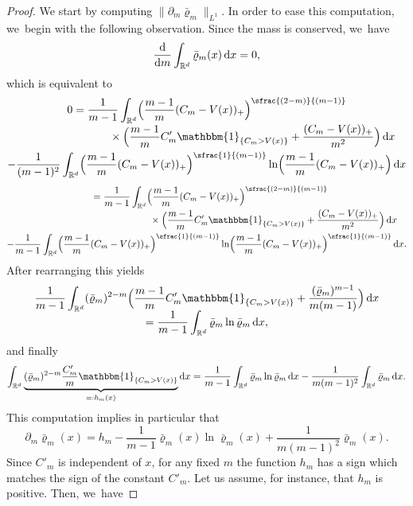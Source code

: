 \documentclass[10pt]{amsart}
\newcommand{\spfrac}[2]{\sfrac{#1}{(#2)}}
\newcommand{\pspfrac}[2]{\sfrac{(#1)}{(#2)}}
\let\mathds\mathbbm
\newcommand{\Bprt}[1]{\Bigl(#1\Bigr)}
\newcommand{\dx}[1]{\mathop{}\!\mathrm{d} #1}
\newcommand{\R}{\mathbb{R}}
\theoremstyle{plain}
\theoremstyle{remark}
\begin{document}
\begin{proof}
We start by computing $\|\partial_m \bar\varrho_m\|_{L^1}$. In order to ease this computation, we~begin with the following observation.
Since the mass is conserved, we~have
\begin{align*}
\frac{\dx}{\dx m} \int_{\R^d} \bar\varrho_m(x) \dx x = 0,
\end{align*}
which is equivalent to
\begin{multline*}
0= \frac{1}{m-1}\int_{\R^d} \Bprt{\frac{m-1}{m}(C_m - V(x))_+}^{\pspfrac{2-m}{m-1}}\\[-3pt]
\shoveright{{}\times\Bprt{\frac{m-1}{m}C'_m{\mathds{1}_{\{C_m > V(x)\}}} + \frac{(C_m - V(x))_+}{m^2}} \dx x}\\
- {\frac{1}{(m-1)^{2}}} \int_{\R^d} \Bprt{\frac{m-1}{m}(C_m - V(x))_+}^{\spfrac{1}{m-1}} \ln \Bprt{\frac{m-1}{m}(C_m - V(x))_+} \dx x
\end{multline*}
\begin{multline*}
\hphantom{0} = \frac{1}{m-1}\int_{\R^d} \Bprt{\frac{m-1}{m}(C_m - V(x))_+}^{\pspfrac{2-m}{m-1}}\\[-3pt]
\shoveright{{}\times\Bprt{\frac{m-1}{m}C'_m{\mathds{1}_{\{C_m > V(x)\}}} + \frac{(C_m - V(x))_+}{m^2}} \dx x} \\
- \frac{1}{m-1} \int_{\R^d} \Bprt{\frac{m-1}{m}(C_m - V(x))_+}^{\spfrac{1}{m-1}} \ln \Bprt{\frac{m-1}{m}(C_m - V(x))_+}^{\spfrac{1}{m-1}} \dx x.
\end{multline*}
After rearranging this yields
\begin{multline*}
\frac{1}{m-1}\int_{\R^d} (\bar\varrho_m)^{2-m} \Bprt{\frac{m-1}{m}C'_m{\mathds{1}_{\{C_m > V(x)\}}} + \frac{(\bar\varrho_m)^{m-1}}{m(m-1)}} \dx x\\[-5pt]
= \frac{1}{m-1} \int_{\R^d} \bar\varrho_m \ln \bar\varrho_m \dx x,
\end{multline*}
and finally
\begin{align*}
\int_{\R^d} \underbrace{(\bar\varrho_m)^{2-m} \frac{C'_m}{m}{{\mathds{1}_{\{C_m > V(x)\}}}}}_{=:h_m(x)}\dx x= \frac{1}{m-1} \int_{\R^d} \bar\varrho_m \ln \bar\varrho_m\dx x - \frac{1}{m(m-1)^2}\int_{\R^d} \bar\varrho_m \dx x.
\end{align*}
This computation implies in particular that
\[
\partial_{m}\bar \varrho_m(x) = h_m - \frac{1}{m-1}\bar\varrho_m(x) \ln \bar\varrho_m(x) + \frac{1}{m(m-1)^2}\bar\varrho_m(x).
\]
Since $C'_m$ is independent of $x$, for any fixed $m$ the function $h_m$ has a sign which matches the sign of the constant $C'_{m}$. Let us assume, for instance, that $h_m$ is positive. Then, we~have

\end{proof}
\end{document}
